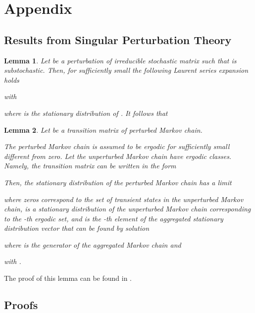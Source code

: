 \documentclass{article}
\newtheorem{lemma}{Lemma}
\begin{document}
\renewcommand{\theequation}{A.\arabic{equation}}
\setcounter{equation}{0}  \renewcommand{\thesubsection}{A.\arabic{subsection}}
\setcounter{subsection}{0}  \renewcommand{\thelemma}{A.\arabic{lemma}}
\setcounter{lemma}{0}  \section*{Appendix}

\subsection{Results from Singular Perturbation Theory}

\begin{lemma}
\label{lm:sp} Let  be a perturbation of
irreducible stochastic matrix  such that  is
substochastic. Then, for sufficiently small  the following
Laurent series expansion holds

with

where  is the stationary distribution of . It follows that


\end{lemma}


\begin{lemma}
\label{lm:SPMC}
Let  be a transition matrix of perturbed Markov chain.

The perturbed Markov chain is assumed to be ergodic for sufficiently small
 different from zero. Let the unperturbed Markov chain 
have  ergodic classes. Namely, the transition matrix  can be written
in the form


Then, the stationary distribution of the perturbed Markov chain has a limit

where zeros correspond to the set of transient states in the unperturbed
Markov chain,  is a stationary distribution of the unperturbed Markov
chain corresponding to the -th ergodic set, and  is the -th
element of the aggregated stationary distribution vector that can be found
by solution

where  is the generator of the aggregated Markov chain and

with .
\end{lemma}
The proof of this lemma can be found in
\cite{Avrachenkov99thesis,KorolyukTurbin,YinZhang}.

\subsection{Proofs}
\label{app:proofs}
\end{document}
